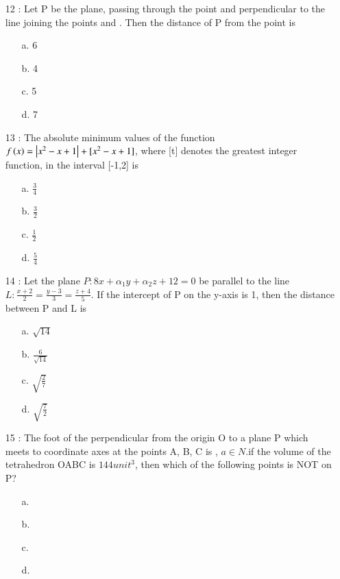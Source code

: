 \documentclass[journal]{IEEEtran}
\begin{document}
\begin{enumerate}
\item[12]: Let P be the plane, passing through the point  and perpendicular to the line joining the points  and . Then the distance of P from the point  is
\begin{enumerate}
     \item [a.] 6
    \item [b.] 4
    \item [c.] 5
    \item [d.] 7
\end{enumerate}
\item[13]: The absolute minimum values of the function $f\left(x\right)=\left\vert x^2-x+1\right\vert+[x^2-x+1]$, where [t] denotes the greatest integer function, in the interval [-1,2] is
\begin{enumerate}
     \item [a.] $\frac{3}{4}$
    \item [b.] $\frac{3}{2}$
    \item [c.] $\frac{1}{2}$
    \item [d.] $\frac{5}{4}$
\end{enumerate}
\item[14]: Let the plane $P:8x+\alpha _1y+\alpha _2z+12=0$ be parallel to the line $L:\frac{x+2}{2}=\frac{y-3}{3}=\frac{z+4}{5}$. If the intercept of P on the y-axis is 1, then the distance between P and L is 
\begin{enumerate}
\item [a.] $\sqrt{14}$
    \item [b.]$\frac{6}{\sqrt{14}}$
    \item [c.] $\sqrt{\frac{2}{7}}$
    \item [d.] $\sqrt{\frac{7}{2}}$
\end{enumerate}
\item[15]: The foot of the perpendicular from the origin O to a plane P which meets to coordinate axes at the points A, B, C
is ,  $a\in N$.if the volume of the tetrahedron OABC is $144 unit^3$, then which of the following points is NOT on P?
\begin{enumerate}
\item [a.] 
    \item [b.] 
    \item [c.] 
    \item [d.] 
\end{enumerate}
\end{enumerate}
\end{document}
